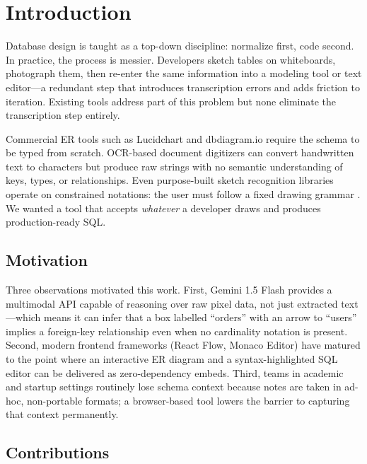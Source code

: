 \documentclass[conference]{IEEEtran}
\begin{document}
\section{Introduction}

Database design is taught as a top-down discipline: normalize first, code
second. In practice, the process is messier. Developers sketch tables on
whiteboards, photograph them, then re-enter the same information into a
modeling tool or text editor---a redundant step that introduces transcription
errors and adds friction to iteration. Existing tools address part of this
problem but none eliminate the transcription step entirely.

Commercial ER tools such as Lucidchart and dbdiagram.io require the schema
to be typed from scratch. OCR-based document digitizers can convert
handwritten text to characters but produce raw strings with no semantic
understanding of keys, types, or relationships. Even purpose-built sketch
recognition libraries operate on constrained notations: the user must follow
a fixed drawing grammar \cite{b1}. We wanted a tool that accepts
\emph{whatever} a developer draws and produces production-ready SQL.

\subsection{Motivation}

Three observations motivated this work. First, Gemini 1.5 Flash provides
a multimodal API capable of reasoning over raw pixel data, not just
extracted text---which means it can infer that a box labelled ``orders''
with an arrow to ``users'' implies a foreign-key relationship even when
no cardinality notation is present. Second, modern frontend frameworks
(React Flow, Monaco Editor) have matured to the point where an
interactive ER diagram and a syntax-highlighted SQL editor can be delivered
as zero-dependency embeds. Third, teams in academic and startup settings
routinely lose schema context because notes are taken in ad-hoc,
non-portable formats; a browser-based tool lowers the barrier to
capturing that context permanently.

\subsection{Contributions}
\end{document}
